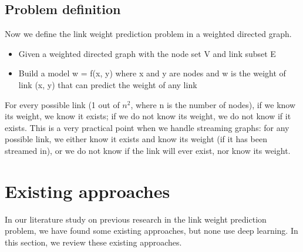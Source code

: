 \documentclass[12pt]{WSUThesis}
\theoremstyle{definition}
\begin{document}
\subsection{Problem definition}
Now we define the link weight prediction problem in a weighted directed graph.
\begin{itemize}
	\item Given a weighted directed graph with the node set V and link subset E
	\item Build a model w = f(x, y) where x and y are nodes and w is the weight of link (x, y) that can predict the weight of any link
\end{itemize}
For every possible link (1 out of $ n^2 $, where n is the number of nodes), 
if we know its weight, we know it exists;
if we do not know its weight, we do not know if it exists.
This is a very practical point when we handle streaming graphs:
for any possible link,
we either know it exists and know its weight (if it has been streamed in), or we do not know if the link will ever exist, nor know its weight.

\section{Existing approaches}
In our literature study on previous research in the link weight prediction problem,
we have found some existing approaches, but none use deep learning.
In this section,
we review these existing approaches.
\end{document}
